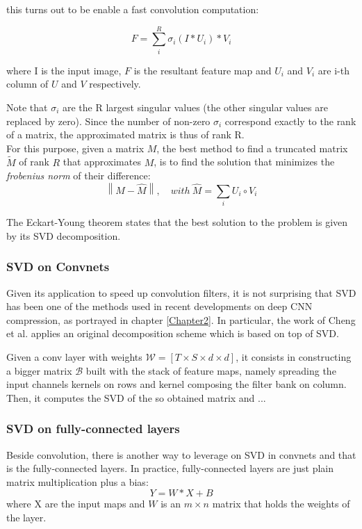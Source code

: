 this turns out to be enable a fast convolution computation: 

\begin{equation}
	F = \sum_{i}^{R} \sigma_i(I * U_i)*V_i  
\end{equation}

where I is the input image, $F$ is the resultant feature map and $U_i$ and $V_i$ are i-th column of $U$ and $V$ respectively. 

Note that $\sigma_i$ are the R largest singular values (the other singular values are replaced by zero). Since the number of non-zero $\sigma_i$ correspond exactly to the rank of a matrix, the approximated matrix is thus of rank R. \\
For this purpose, given a matrix $M$, the best method to find a truncated matrix $\tilde{M}$ of rank $R$ that approximates $M$, is to find the solution that minimizes the \emph{frobenius norm} of their difference:
\begin{equation}
\left \| M - \hat{M} \right \|, \quad with \ \hat{M} = \sum_i U_i \circ V_i
\end{equation}

The Eckart-Young theorem \parencite{Weckart} states that the best solution to the problem is given by its SVD decomposition. 

\subsubsection{SVD on Convnets}
Given its application to speed up convolution filters, it is not surprising that SVD has been one of the methods used in recent developments on deep CNN compression, as portrayed in chapter \ref{Chapter2}.
In particular, the work of Cheng et al. \parencite{tai2015SVD} applies an original decomposition scheme which is based on top of SVD. 

Given a conv layer with weights $\mathcal{W} = [T \times S \times d \times d]$, it consists in constructing a bigger matrix $\mathcal{B}$ built with the stack of feature maps, namely spreading the input channels kernels on rows and kernel composing the filter bank on column. Then, it computes the SVD of the so obtained matrix and ... 
 

\subsubsection{SVD on fully-connected layers}
Beside convolution, there is another way to leverage on SVD in convnets and that is the fully-connected layers. In practice, fully-connected layers are just plain matrix multiplication plus a bias:
\begin{equation}
\label{eq:fc}
Y = W*X+B 
\end{equation}
where X are the input maps and $W$ is an $m \times n$ matrix that holds the weights of the layer.  

